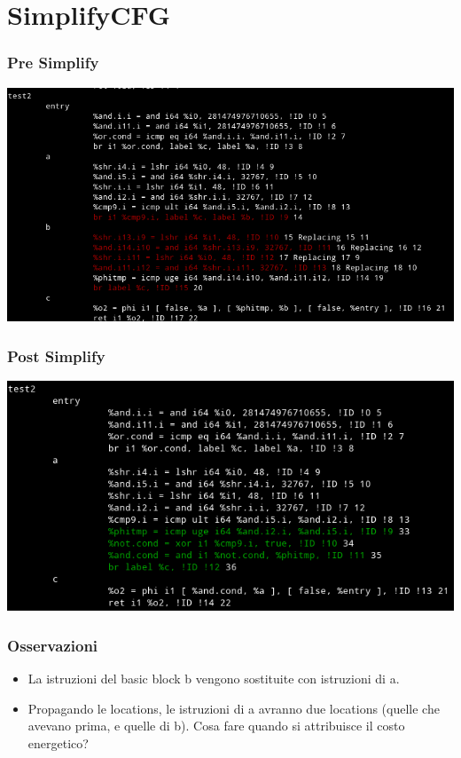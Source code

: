 \documentclass{beamer}
\begin{document}
\section{SimplifyCFG}

\begin{frame}
\frametitle{Pre Simplify}
\includegraphics[scale=0.45]{pre_simpl.png}
\end{frame}

\begin{frame}
\frametitle{Post Simplify}
\includegraphics[scale=0.5]{post_simpl.png}
\end{frame}

\begin{frame}
\frametitle{Osservazioni}
\begin{itemize}
\item La istruzioni del basic block b vengono sostituite con istruzioni di a.
\item Propagando le locations, le istruzioni di a avranno due locations (quelle che avevano prima, e quelle di b). \newline
Cosa fare quando si attribuisce il costo energetico?
\end{itemize}
\end{frame}
\end{document}
